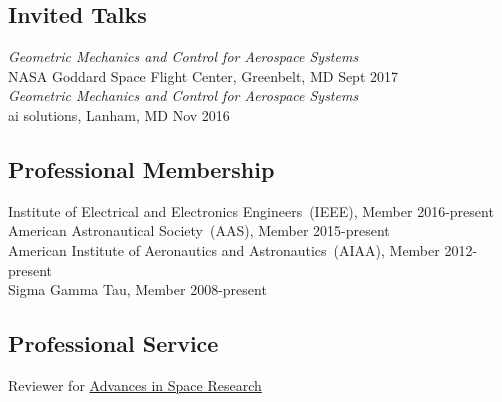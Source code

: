 
\subsection*{Invited Talks}
{}
\textit{Geometric Mechanics and Control for Aerospace Systems} \\NASA Goddard Space Flight Center, Greenbelt, MD \hfill {Sept 2017}\\
\textit{Geometric Mechanics and Control for Aerospace Systems} \\ai solutions, Lanham, MD \hfill {Nov 2016}

\subsection*{Professional Membership}
{}
Institute of Electrical and Electronics Engineers~(IEEE), Member \hfill {2016-present} \\
American Astronautical Society~(AAS), Member \hfill {2015-present} \\
American Institute of Aeronautics and Astronautics~(AIAA), Member \hfill {2012-present} \\
Sigma Gamma Tau, Member \hfill  {2008-present} \\

\subsection*{Professional Service}
Reviewer for \href{http://www.journals.elsevier.com/advances-in-space-research/}{Advances in Space Research}

